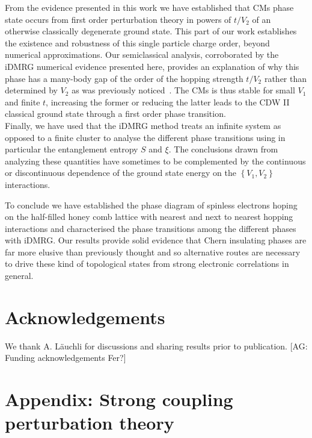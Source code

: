 \documentclass[aps,prx,10pt,twocolumn,floatfix,superscriptaddress,showpacs,numerical,footinbib]{revtex4-1}
\newcommand{\noteAG}[1]{{\color{blue} [AG: #1]}}
\begin{document}
From the evidence presented in this work we have established that CMs phase state occurs from first
order perturbation theory in powers of $t/V_{2}$ of an otherwise classically degenerate ground state.
%
This part of our work establishes the existence and robustness 
of this single particle charge order, beyond numerical approximations.
%
Our semiclassical analysis, corroborated by the iDMRG numerical evidence presented here,
provides an explanation of why this phase has a many-body gap of the order of the hopping strength $t/V_{2}$ 
rather than determined by $V_{2}$ as was previously noticed~\cite{GCC13,DH14,DCH14}.
%
The CMs is thus stable for small $V_{1}$ and finite $t$, increasing the former or reducing the latter leads to the CDW II classical ground state
through a first order phase transition.\\
%
Finally, we have used that the iDMRG method treats an infinite system as opposed to a finite cluster to analyse 
the different phase transitions using in particular the entanglement entropy $S$ and $\xi$.
%
The conclusions drawn from analyzing these quantities have sometimes to be complemented by the continuous 
or discontinuous dependence of the ground state energy on the $\left\lbrace V_{1},V_{2}\right\rbrace$ interactions.
%

To conclude we have established the phase diagram of spinless electrons hoping on the half-filled honey comb lattice
with nearest and next to nearest hopping interactions and characterised the phase transitions among the different phases with iDMRG.
%
Our results provide solid evidence that Chern insulating phases are far more elusive than previously thought and
so alternative routes are necessary to drive these kind of topological states from strong electronic correlations in general.
%
\section{Acknowledgements}

We thank A. L\"auchli for discussions and sharing results prior to publication.
\noteAG{Funding acknowledgements Fer?}

\section{\label{sec:appendix} Appendix: Strong coupling perturbation theory}
\end{document}
